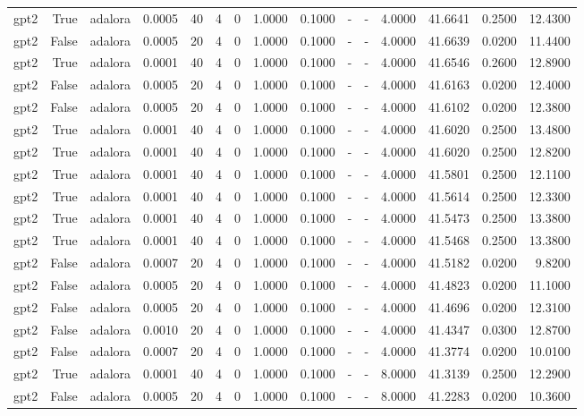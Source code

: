 \begin{tabular}{lrlrrrrrrlllrrr}
gpt2 & True & adalora & 0.0005 & 40 & 4 & 0 & 1.0000 & 0.1000 & - & - & 4.0000 & 41.6641 & 0.2500 & 12.4300 \\
gpt2 & False & adalora & 0.0005 & 20 & 4 & 0 & 1.0000 & 0.1000 & - & - & 4.0000 & 41.6639 & 0.0200 & 11.4400 \\
gpt2 & True & adalora & 0.0001 & 40 & 4 & 0 & 1.0000 & 0.1000 & - & - & 4.0000 & 41.6546 & 0.2600 & 12.8900 \\
gpt2 & False & adalora & 0.0005 & 20 & 4 & 0 & 1.0000 & 0.1000 & - & - & 4.0000 & 41.6163 & 0.0200 & 12.4000 \\
gpt2 & False & adalora & 0.0005 & 20 & 4 & 0 & 1.0000 & 0.1000 & - & - & 4.0000 & 41.6102 & 0.0200 & 12.3800 \\
gpt2 & True & adalora & 0.0001 & 40 & 4 & 0 & 1.0000 & 0.1000 & - & - & 4.0000 & 41.6020 & 0.2500 & 13.4800 \\
gpt2 & True & adalora & 0.0001 & 40 & 4 & 0 & 1.0000 & 0.1000 & - & - & 4.0000 & 41.6020 & 0.2500 & 12.8200 \\
gpt2 & True & adalora & 0.0001 & 40 & 4 & 0 & 1.0000 & 0.1000 & - & - & 4.0000 & 41.5801 & 0.2500 & 12.1100 \\
gpt2 & True & adalora & 0.0001 & 40 & 4 & 0 & 1.0000 & 0.1000 & - & - & 4.0000 & 41.5614 & 0.2500 & 12.3300 \\
gpt2 & True & adalora & 0.0001 & 40 & 4 & 0 & 1.0000 & 0.1000 & - & - & 4.0000 & 41.5473 & 0.2500 & 13.3800 \\
gpt2 & True & adalora & 0.0001 & 40 & 4 & 0 & 1.0000 & 0.1000 & - & - & 4.0000 & 41.5468 & 0.2500 & 13.3800 \\
gpt2 & False & adalora & 0.0007 & 20 & 4 & 0 & 1.0000 & 0.1000 & - & - & 4.0000 & 41.5182 & 0.0200 & 9.8200 \\
gpt2 & False & adalora & 0.0005 & 20 & 4 & 0 & 1.0000 & 0.1000 & - & - & 4.0000 & 41.4823 & 0.0200 & 11.1000 \\
gpt2 & False & adalora & 0.0005 & 20 & 4 & 0 & 1.0000 & 0.1000 & - & - & 4.0000 & 41.4696 & 0.0200 & 12.3100 \\
gpt2 & False & adalora & 0.0010 & 20 & 4 & 0 & 1.0000 & 0.1000 & - & - & 4.0000 & 41.4347 & 0.0300 & 12.8700 \\
gpt2 & False & adalora & 0.0007 & 20 & 4 & 0 & 1.0000 & 0.1000 & - & - & 4.0000 & 41.3774 & 0.0200 & 10.0100 \\
gpt2 & True & adalora & 0.0001 & 40 & 4 & 0 & 1.0000 & 0.1000 & - & - & 8.0000 & 41.3139 & 0.2500 & 12.2900 \\
gpt2 & False & adalora & 0.0005 & 20 & 4 & 0 & 1.0000 & 0.1000 & - & - & 8.0000 & 41.2283 & 0.0200 & 10.3600 \\

\end{tabular}
